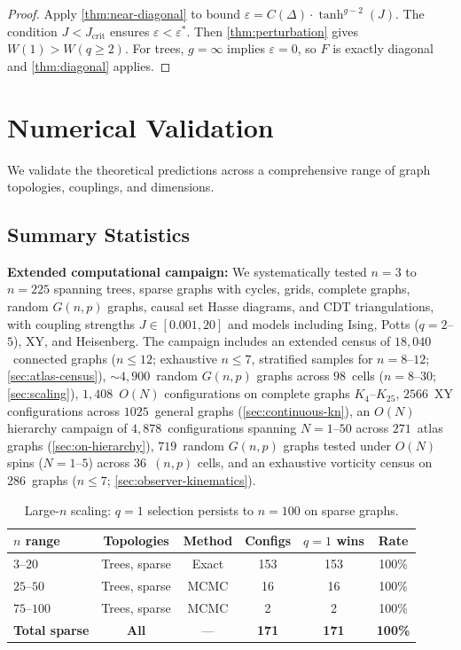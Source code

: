 \documentclass[11pt]{article}
\theoremstyle{definition}
\theoremstyle{remark}
\begin{document}
\begin{proof}
Apply \cref{thm:near-diagonal} to bound $\varepsilon = C(\Delta) \cdot \tanh^{g-2}(J)$.
The condition $J < J_{\mathrm{crit}}$ ensures $\varepsilon < \varepsilon^*$.
Then \cref{thm:perturbation} gives $W(1) > W(q \geq 2)$. For trees, $g = \infty$
implies $\varepsilon = 0$, so $F$ is exactly diagonal and
\cref{thm:diagonal} applies.
\end{proof}


\section{Numerical Validation}
\label{sec:numerical}

We validate the theoretical predictions across a comprehensive range of
graph topologies, couplings, and dimensions.

\subsection{Summary Statistics}

\textbf{Extended computational campaign:} We systematically tested $n = 3$ to
$n = 225$ spanning trees, sparse graphs with
cycles, grids, complete graphs, random $G(n,p)$ graphs, causal set Hasse
diagrams, and CDT triangulations, with coupling strengths
$J \in [0.001, 20]$ and models including Ising, Potts ($q = 2$--$5$), XY, and
Heisenberg. The campaign includes an extended census of $18{,}040$~connected
graphs ($n \leq 12$; exhaustive $n \leq 7$, stratified samples for $n = 8$--$12$;
\cref{sec:atlas-census}), ${\sim}4{,}900$~random $G(n,p)$ graphs across $98$~cells
($n = 8$--$30$; \cref{sec:scaling}),
$1{,}408$~$O(N)$ configurations on complete graphs $K_4$--$K_{25}$,
$2566$~XY configurations across $1025$~general graphs (\cref{sec:continuous-kn}),
an $O(N)$ hierarchy campaign of $4{,}878$~configurations spanning $N = 1$--$50$
across $271$~atlas graphs (\cref{sec:on-hierarchy}), $719$~random $G(n,p)$
graphs tested under $O(N)$ spins ($N = 1$--$5$) across $36$~$(n,p)$ cells,
and an exhaustive vorticity census on $286$~graphs ($n \leq 7$;
\cref{sec:observer-kinematics}).

\begin{table}[htbp]
\centering
\caption{Large-$n$ scaling: $q=1$ selection persists to $n=100$ on sparse graphs.}
\label{tab:large-n}
\begin{tabular}{@{}lccccc@{}}
\toprule
$n$ range & Topologies & Method & Configs & $q{=}1$ wins & Rate \\
\midrule
$3$--$20$ & Trees, sparse & Exact & 153 & 153 & 100\% \\
$25$--$50$ & Trees, sparse & MCMC & 16 & 16 & 100\% \\
$75$--$100$ & Trees, sparse & MCMC & 2 & 2 & 100\% \\
\midrule
\textbf{Total sparse} & \textbf{All} & --- & \textbf{171} & \textbf{171} & \textbf{100\%} \\
\bottomrule
\end{tabular}
\end{table}
\end{document}
